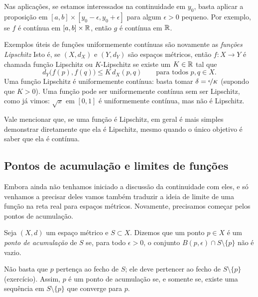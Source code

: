 Nas aplicações, se estamos interessados na continuidade em $y_0$, basta
aplicar a proposição em $[a,b] \times [y_0-\epsilon,y_0+\epsilon]$
para algum $\epsilon > 0$ pequeno. Por exemplo, se $f$ é contínua em
$[a,b] \times {\mathbb{R}}$, então $g$ é contínua em ${\mathbb{R}}$.

\begin{example}
Exemplos úteis de funções uniformemente contínuas são novamente as
\emph{funções Lipschitz}%
%
Isto é, se
$(X,d_X)$ e $(Y,d_Y)$ são espaços métricos, então $f \colon X \to Y$
é chamada função Lipschitz ou $K$-Lipschitz se existe um $K \in {\mathbb{R}}$ tal que
\begin{equation*}
d_Y\bigl(f(p),f(q)\bigr) \leq K \, d_X(p,q)
\qquad \text{para todos } p,q \in X.
\end{equation*}
Uma função Lipschitz é uniformemente contínua:
basta tomar $\delta = \nicefrac{\epsilon}{K}$ (supondo que $K > 0$).
Uma função pode ser uniformemente contínua
sem ser Lipschitz,
como já vimos: $\sqrt{x}$ em $[0,1]$
é uniformemente contínua, mas não é Lipschitz.

Vale mencionar que,
se uma função é Lipschitz, em geral é
mais simples demonstrar diretamente que ela é Lipschitz, mesmo quando
o único objetivo é saber que ela é contínua.
\end{example}

\subsection{Pontos de acumulação e limites de funções}

Embora ainda não tenhamos iniciado a discussão da continuidade com eles,
e só venhamos a precisar deles
vamos também
traduzir a ideia de limite de uma função na reta real para espaços métricos.
Novamente, precisamos começar pelos pontos de acumulação.

\begin{defn}
Seja $(X,d)$ um espaço métrico e
$S \subset X$. Dizemos que um ponto $p \in X$ é
um \emph{ponto de acumulação} de $S$
se, para todo $\epsilon > 0$, o conjunto $B(p,\epsilon) \cap S
\setminus \{ p \}$ não é vazio.
\end{defn}

Não basta que $p$ pertença ao fecho de $S$;
ele deve pertencer ao fecho de
$S \setminus \{ p \}$ (exercício).
Assim, $p$ é um ponto de acumulação se, e somente se, existe uma sequência em $S \setminus
\{ p \}$ que converge para $p$.

